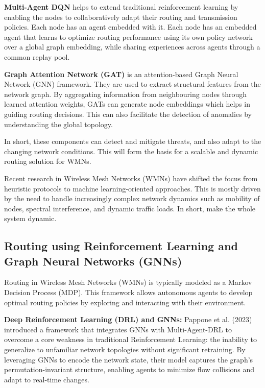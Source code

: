 \documentclass[conference]{IEEEtran}
\begin{document}
\textbf{Multi-Agent DQN} helps to extend traditional reinforcement learning by enabling the nodes to collaboratively adapt their routing and transmission policies. Each node has an agent embedded with it. Each node has an embedded agent that learns to optimize routing performance using its own policy network over a global graph embedding, while sharing experiences across agents through a common replay pool.

\textbf{Graph Attention Network (GAT)} is an attention-based Graph Neural Network (GNN) framework. They are used to extract structural features from the network graph. By aggregating information from neighbouring nodes through learned attention weights, GATs can generate node embeddings which helps in guiding routing decisions. This can also facilitate the detection of anomalies by understanding the global topology.

In short, these components can detect and mitigate threats, and also adapt to the changing network conditions. This will form the basis for a scalable and dynamic routing solution for WMNs.

Recent research in Wireless Mesh Networks (WMNs) have shifted the focus from heuristic protocols to machine learning-oriented approaches. This is mostly driven by the need to handle increasingly complex network dynamics such as mobility of nodes, spectral interference, and dynamic traffic loads. In short, make the whole system dynamic.

\subsection{Routing using Reinforcement Learning and Graph Neural Networks (GNNs)}

Routing in Wireless Mesh Networks (WMNs) is typically modeled as a Markov Decision Process (MDP). This framework allows autonomous agents to develop optimal routing policies by exploring and interacting with their environment.

\textbf{Deep Reinforcement Learning (DRL) and GNNs:} Pappone et al. (2023) introduced a framework that integrates GNNs with Multi-Agent-DRL to overcome a core weakness in traditional Reinforcement Learning: the inability to generalize to unfamiliar network topologies without significant retraining. By leveraging GNNs to encode the network state, their model captures the graph's permutation-invariant structure, enabling agents to minimize flow collisions and adapt to real-time changes.
\end{document}
